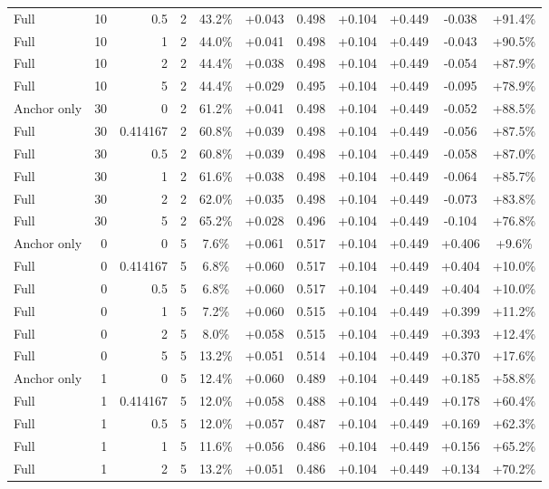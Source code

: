 \begin{table}[htbp]
\begin{tabular}{lrrrccccccc}
Full & 10 & 0.5 & 2 & 43.2\% & +0.043 & 0.498 & +0.104 & +0.449 & -0.038 & +91.4\% \\
Full & 10 & 1 & 2 & 44.0\% & +0.041 & 0.498 & +0.104 & +0.449 & -0.043 & +90.5\% \\
Full & 10 & 2 & 2 & 44.4\% & +0.038 & 0.498 & +0.104 & +0.449 & -0.054 & +87.9\% \\
Full & 10 & 5 & 2 & 44.4\% & +0.029 & 0.495 & +0.104 & +0.449 & -0.095 & +78.9\% \\
Anchor only & 30 & 0 & 2 & 61.2\% & +0.041 & 0.498 & +0.104 & +0.449 & -0.052 & +88.5\% \\
Full & 30 & 0.414167 & 2 & 60.8\% & +0.039 & 0.498 & +0.104 & +0.449 & -0.056 & +87.5\% \\
Full & 30 & 0.5 & 2 & 60.8\% & +0.039 & 0.498 & +0.104 & +0.449 & -0.058 & +87.0\% \\
Full & 30 & 1 & 2 & 61.6\% & +0.038 & 0.498 & +0.104 & +0.449 & -0.064 & +85.7\% \\
Full & 30 & 2 & 2 & 62.0\% & +0.035 & 0.498 & +0.104 & +0.449 & -0.073 & +83.8\% \\
Full & 30 & 5 & 2 & 65.2\% & +0.028 & 0.496 & +0.104 & +0.449 & -0.104 & +76.8\% \\
Anchor only & 0 & 0 & 5 & 7.6\% & +0.061 & 0.517 & +0.104 & +0.449 & +0.406 & +9.6\% \\
Full & 0 & 0.414167 & 5 & 6.8\% & +0.060 & 0.517 & +0.104 & +0.449 & +0.404 & +10.0\% \\
Full & 0 & 0.5 & 5 & 6.8\% & +0.060 & 0.517 & +0.104 & +0.449 & +0.404 & +10.0\% \\
Full & 0 & 1 & 5 & 7.2\% & +0.060 & 0.515 & +0.104 & +0.449 & +0.399 & +11.2\% \\
Full & 0 & 2 & 5 & 8.0\% & +0.058 & 0.515 & +0.104 & +0.449 & +0.393 & +12.4\% \\
Full & 0 & 5 & 5 & 13.2\% & +0.051 & 0.514 & +0.104 & +0.449 & +0.370 & +17.6\% \\
Anchor only & 1 & 0 & 5 & 12.4\% & +0.060 & 0.489 & +0.104 & +0.449 & +0.185 & +58.8\% \\
Full & 1 & 0.414167 & 5 & 12.0\% & +0.058 & 0.488 & +0.104 & +0.449 & +0.178 & +60.4\% \\
Full & 1 & 0.5 & 5 & 12.0\% & +0.057 & 0.487 & +0.104 & +0.449 & +0.169 & +62.3\% \\
Full & 1 & 1 & 5 & 11.6\% & +0.056 & 0.486 & +0.104 & +0.449 & +0.156 & +65.2\% \\
Full & 1 & 2 & 5 & 13.2\% & +0.051 & 0.486 & +0.104 & +0.449 & +0.134 & +70.2\% \\

\end{tabular}
\end{table}
